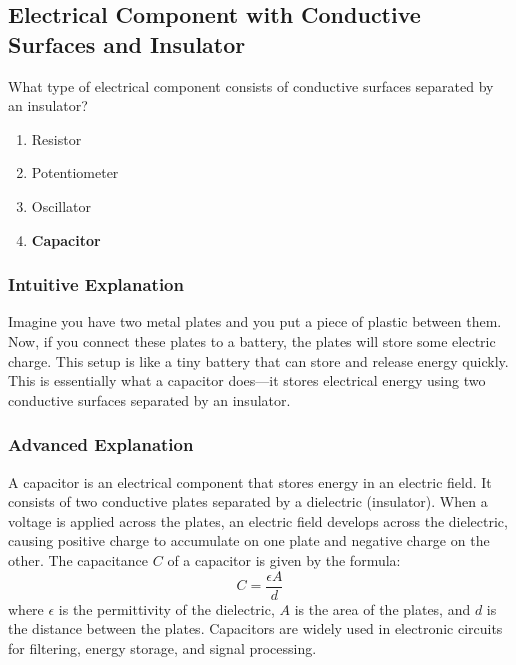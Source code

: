 \subsection{Electrical Component with Conductive Surfaces and Insulator}
\label{T6A05}

\begin{tcolorbox}[colback=gray!10!white,colframe=black!75!black,title=T6A05]
What type of electrical component consists of conductive surfaces separated by an insulator?
\begin{enumerate}[noitemsep]
    \item Resistor
    \item Potentiometer
    \item Oscillator
    \item \textbf{Capacitor}
\end{enumerate}
\end{tcolorbox}

\subsubsection*{Intuitive Explanation}
Imagine you have two metal plates and you put a piece of plastic between them. Now, if you connect these plates to a battery, the plates will store some electric charge. This setup is like a tiny battery that can store and release energy quickly. This is essentially what a capacitor does—it stores electrical energy using two conductive surfaces separated by an insulator.

\subsubsection*{Advanced Explanation}
A capacitor is an electrical component that stores energy in an electric field. It consists of two conductive plates separated by a dielectric (insulator). When a voltage is applied across the plates, an electric field develops across the dielectric, causing positive charge to accumulate on one plate and negative charge on the other. The capacitance \( C \) of a capacitor is given by the formula:
\[
C = \frac{\epsilon A}{d}
\]
where \( \epsilon \) is the permittivity of the dielectric, \( A \) is the area of the plates, and \( d \) is the distance between the plates. Capacitors are widely used in electronic circuits for filtering, energy storage, and signal processing.